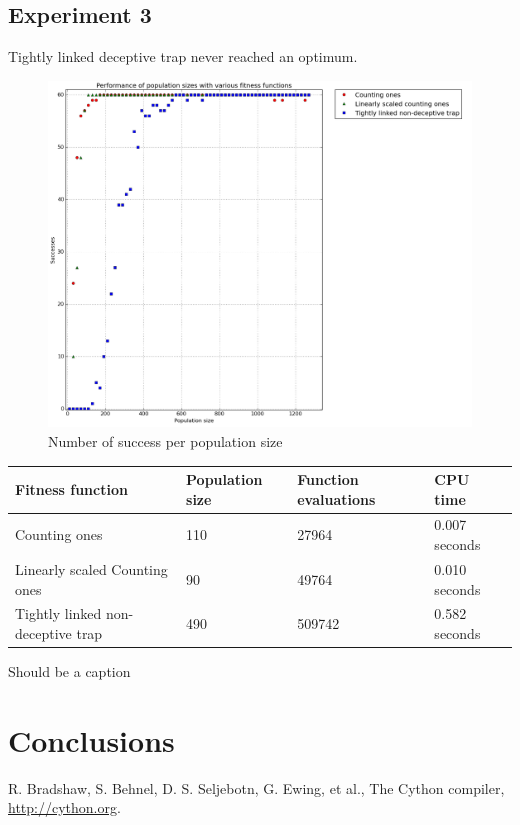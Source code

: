 \documentclass[12pt]{article}
\theoremstyle{definition}
\begin{document}
\subsection*{Experiment 3}
Tightly linked deceptive trap never reached an optimum.

\begin{figure}[H]
    \centering
    \includegraphics[totalheight=0.7\textheight]{images/exp3.png}
    \caption{Number of success per population size}
\label{fig:exp3}
\end{figure}

\begin{adjustwidth}{-1cm}{}
\begin{minipage}{\linewidth}
\centering
{}
\label{tab:title}
\begin{tabular}{llll}
\toprule[1.5pt]
\bf Fitness function & \bf Population size & \bf Function evaluations & \bf CPU time\\\midrule
Counting ones & 110 & 27964 & 0.007 seconds \\
Linearly scaled Counting ones & 90 & 49764 & 0.010 seconds \\
Tightly linked non-deceptive trap & 490 & 509742 & 0.582 seconds \\
\bottomrule[1.25pt]
\end{tabular}\par
\bigskip
Should be a caption
\end{minipage}
\end{adjustwidth}



\section{Conclusions}



\begin{thebibliography}{9}

R. Bradshaw, S. Behnel, D. S. Seljebotn, G. Ewing, et al.,
The Cython compiler, \url{http://cython.org}.

\end{thebibliography}
\end{document}

